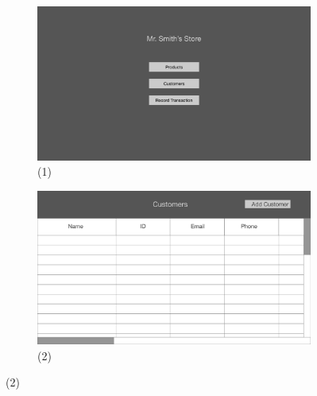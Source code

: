 \documentclass[notitlepage,11pt]{article}
\begin{document}
\begin{figure}[h]
	\begin{subfigure}{.5\textwidth}
	\centering
	\includegraphics[scale=0.12]{MainMenu}
	\caption{(1)}
	\end{subfigure}%
	\begin{subfigure}{.5\textwidth}
	\centering
	\includegraphics[scale=0.12]{AddCustomer}
	\caption{(2)}
	\end{subfigure}
\end{figure}
\end{document}

